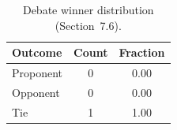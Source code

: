 \begin{table}[t]
\centering
\caption{Debate winner distribution (Section~7.6).}
\label{tab:debate-winners}
\begin{tabular}{lcc}
\toprule
Outcome & Count & Fraction \\
\midrule
  Proponent & 0 & 0.00 \\
  Opponent & 0 & 0.00 \\
  Tie & 1 & 1.00 \\
\bottomrule
\end{tabular}
\end{table}